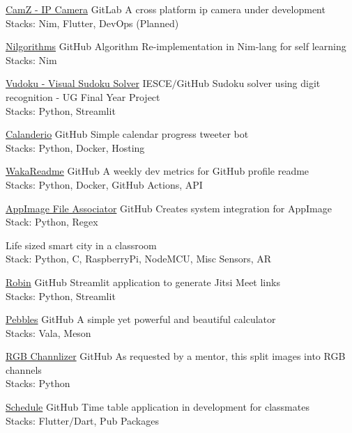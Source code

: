 \documentclass[
	a4paper,
]{fortysecondscv}
\begin{document}
\newpage
\makebacksidebar

\begin{cvtable}[2]
    
    {\href{https://gitlab.com/ipcam}{CamZ - IP Camera}}
    {GitLab}
    {A cross platform ip camera under development\\
    Stacks: Nim, Flutter, DevOps (Planned)}
    
    {\href{https://github.com/joe733/nilgorithms}{Nilgorithms}}
    {GitHub}
    {Algorithm Re-implementation in Nim-lang for self learning\\
    Stacks: Nim}

    {\href{https://github.com/joe733/vudoku}{Vudoku - Visual Sudoku Solver}}
    {IESCE$/$GitHub}
    {Sudoku solver using digit recognition - UG Final Year Project\\
    Stacks: Python, Streamlit}
    
    {\href{https://github.com/joe733/Calendario/}{Calanderio}}
    {GitHub}
	{Simple calendar progress tweeter bot\\
	Stacks: Python, Docker, Hosting}
	
	{\href{https://github.com/athul/waka-readme}{WakaReadme}}
	{GitHub}
	{A weekly dev metrics for GitHub profile readme\\
	Stacks: Python, Docker, GitHub Actions, API}
	
	{\href{https://github.com/joe733/appimage_file_associator}{AppImage File Associator}}
	{GitHub}
	{Creates system integration for AppImage\\
	Stack: Python, Regex}
	
	{Life sized smart city in a classroom\\
	Stack: Python, C, RaspberryPi, NodeMCU, Misc Sensors, AR}
	
	{\href{https://github.com/joe733/robin}{Robin}}
	{GitHub}
	{Streamlit application to generate Jitsi Meet links\\
	Stacks: Python, Streamlit}
	
	{\href{https://github.com/joe733/pebbles}{Pebbles}}
	{GitHub}
	{A simple yet powerful and beautiful calculator\\
	Stacks: Vala, Meson}
	
	{\href{https://github.com/joe733/eye-defect/}{RGB Channlizer}}
	{GitHub}
	{As requested by a mentor, this split images into RGB channels\\
	Stacks: Python}
	
	{\href{https://github.com/joe733/schedule}{Schedule}}
	{GitHub}
	{Time table application in development for classmates\\
	Stacks: Flutter$/$Dart, Pub Packages}
\end{cvtable}
\end{document}
